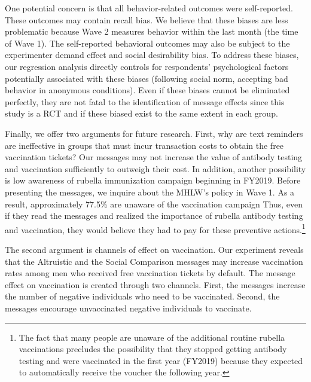 \documentclass[
]{article}
\begin{document}
One potential concern is that all behavior-related outcomes were self-reported. These outcomes may contain recall bias. We believe that these biases are less problematic because Wave 2 measures behavior within the last month (the time of Wave 1). The self-reported behavioral outcomes may also be subject to the experimenter demand effect and social desirability bias. To address these biases, our regression analysis directly controls for respondents' psychological factors potentially associated with these biases (following social norm, accepting bad behavior in anonymous conditions). Even if these biases cannot be eliminated perfectly, they are not fatal to the identification of message effects since this study is a RCT and if these biased exist to the same extent in each group.

Finally, we offer two arguments for future research. First, why are text reminders are ineffective in groups that must incur transaction costs to obtain the free vaccination tickets? Our messages may not increase the value of antibody testing and vaccination sufficiently to outweigh their cost. In addition, another possibility is low awareness of rubella immunization campaign beginning in FY2019. Before presenting the messages, we inquire about the MHLW's policy in Wave 1. As a result, approximately 77.5\% are unaware of the vaccination campaign Thus, even if they read the messages and realized the importance of rubella antibody testing and vaccination, they would believe they had to pay for these preventive actions.\footnote{The fact that many people are unaware of the additional routine rubella vaccinations precludes the possibility that they stopped getting antibody testing and were vaccinated in the first year (FY2019) because they expected to automatically receive the voucher the following year.}

The second argument is channels of effect on vaccination. Our experiment reveals that the Altruistic and the Social Comparison messages may increase vaccination rates among men who received free vaccination tickets by default. The message effect on vaccination is created through two channels. First, the messages increase the number of negative individuals who need to be vaccinated. Second, the messages encourage unvaccinated negative individuals to vaccinate.
\end{document}
